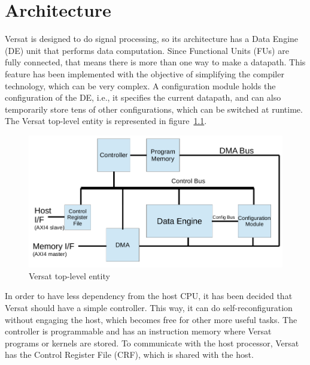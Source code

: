 
\chapter{Architecture}
\label{chapter:architecture}

Versat is designed to do signal processing, so its architecture has a
Data Engine (DE) unit that performs data computation. Since Functional
Units (FUs) are fully connected, that means there is more than one way
to make a datapath. This feature has been implemented with the objective
of simplifying the compiler technology, which can be very complex. A
configuration module holds the configuration of the DE, i.e., it
specifies the current datapath, and can also temporarily store tens of
other configurations, which can be switched at runtime. The Versat
top-level entity is represented in figure~\ref{fig_top}.

\begin{figure}[!htb]
\centering
\includegraphics[width=.7\textwidth]{drawings/top}
\caption{Versat top-level entity}
\label{fig_top}
\end{figure}

In order to have less dependency from the host CPU, it has been
decided that Versat should have a simple controller. This way, it can
do self-reconfiguration without engaging the host, which becomes free
for other more useful tasks. The controller is programmable and has an
instruction memory where Versat programs or kernels are stored.
To communicate with the host processor, Versat has the Control
Register File (CRF), which is shared with the host.

